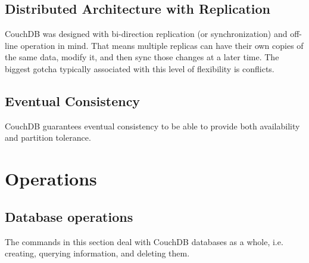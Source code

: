 \subsection{Distributed Architecture with Replication}

CouchDB was designed with bi-direction replication (or synchronization) and off-line operation in mind. That means multiple replicas can have their own copies of the same data, modify it, and then sync those changes at a later time. The biggest gotcha typically associated with this level of flexibility is conflicts.

\subsection{Eventual Consistency}

CouchDB guarantees eventual consistency to be able to provide both availability and partition tolerance.

\section{Operations}

\subsection{Database operations}

The commands in this section deal with CouchDB databases as a whole, i.e. creating, querying information, and deleting them.

